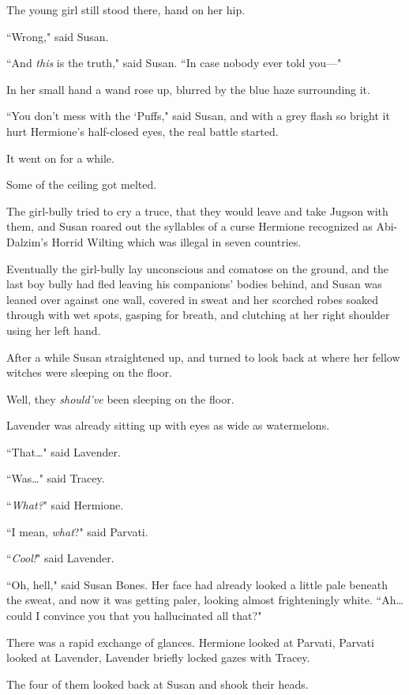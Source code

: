 The young girl still stood there, hand on her hip.

``Wrong," said Susan.

``And \emph{this} is the truth," said Susan. ``In case nobody ever told you—"

In her small hand a wand rose up, blurred by the blue haze surrounding it.

``You don't mess with the `Puffs," said Susan, and with a grey flash so bright it hurt Hermione's half-closed eyes, the real battle started.

It went on for a while.

Some of the ceiling got melted.

The girl-bully tried to cry a truce, that they would leave and take Jugson with them, and Susan roared out the syllables of a curse Hermione recognized as Abi-Dalzim's Horrid Wilting which was illegal in seven countries.

Eventually the girl-bully lay unconscious and comatose on the ground, and the last boy bully had fled leaving his companions' bodies behind, and Susan was leaned over against one wall, covered in sweat and her scorched robes soaked through with wet spots, gasping for breath, and clutching at her right shoulder using her left hand.

After a while Susan straightened up, and turned to look back at where her fellow witches were sleeping on the floor.

Well, they \emph{should've} been sleeping on the floor.

Lavender was already sitting up with eyes as wide as watermelons.

``That{\ldots}" said Lavender.

``Was{\ldots}" said Tracey.

``\emph{What?}" said Hermione.

``I mean, \emph{what}?" said Parvati.

``\emph{Cool!}" said Lavender.

``Oh, hell," said Susan Bones. Her face had already looked a little pale beneath the sweat, and now it was getting paler, looking almost frighteningly white. ``Ah{\ldots} could I convince you that you hallucinated all that?"

There was a rapid exchange of glances. Hermione looked at Parvati, Parvati looked at Lavender, Lavender briefly locked gazes with Tracey.

The four of them looked back at Susan and shook their heads.

